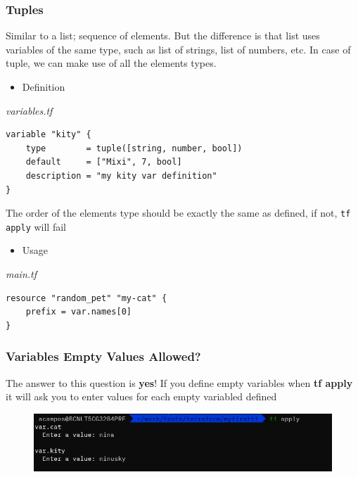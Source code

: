 \documentclass{article}
\newenvironment{blocktemplateIII}[1]{%
    \tcolorbox[beamer,%
    noparskip,breakable,
    ,colframe=Red,%
    colbacklower=LimeGreen!75!LightGreen,%
    title=#1]}%
    {\endtcolorbox}
\newenvironment{codetemplate}[1][]{%
  \mybasecolorbox[#1]
  \itshape
}{%
  \endmybasecolorbox
}
\begin{document}
\subsubsection{Tuples} 
Similar to a list; sequence of elements. But the difference is that list uses variables of the same type, such as list of strings, list of numbers, etc. In case of tuple, we can make use of all the elements types.
\begin{itemize}
    \item Definition
\end{itemize}
\begin{codetemplate}{variables.tf}
\begin{verbatim}
variable "kity" {
    type        = tuple([string, number, bool])
    default     = ["Mixi", 7, bool]
    description = "my kity var definition"
}
\end{verbatim}
\end{codetemplate}

\begin{blocktemplateIII}{WARNING}
The order of the elements type should be exactly the same as defined, if not, \verb+tf apply+ will fail
\end{blocktemplateIII}

\begin{itemize}
    \item Usage
\end{itemize}
\begin{codetemplate}{main.tf}
\begin{verbatim}
resource "random_pet" "my-cat" {
    prefix = var.names[0]
}
\end{verbatim}
\end{codetemplate}

\subsubsection{Variables Empty Values Allowed?}
The answer to this question is \textbf{yes}! If you define empty variables when \textbf{tf apply} it will ask you to enter values for each empty variabled defined

\begin{figure}[H]
    \includegraphics[width=\textwidth]{pictures/pic6.png}
    \centering
\end{figure}
\end{document}
